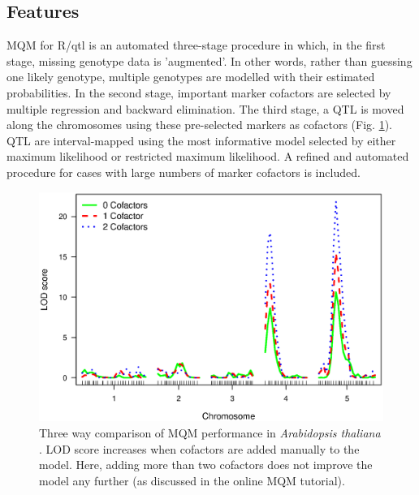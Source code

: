 \subsection{Features}
MQM for R/qtl is an automated three-stage procedure in which, in the first stage, missing 
genotype data is 'augmented'.  In other words, rather than guessing one likely genotype, 
multiple genotypes are modelled with their estimated probabilities. In the second stage, 
important marker cofactors are selected by multiple regression and backward elimination. 
The third stage, a QTL is moved along the chromosomes using these pre-selected markers as 
cofactors (Fig. \ref{fig:comparison}). QTL are interval-mapped using the most informative 
model selected by either maximum likelihood or restricted maximum likelihood. A refined 
and automated procedure for cases with large numbers of marker cofactors is included. 

\begin{figure}[h!]
  \centering
  \includegraphics[keepaspectratio,scale=0.30]{eps/image_3_3.eps}
  \caption[Comparison of QTL mapping methodologies.]{ Three way comparison of MQM performance in {\it Arabidopsis 
          thaliana} \citep{Fu:2007}. LOD score increases when cofactors are added manually to the model. Here, 
          adding more than two cofactors does not improve the model any further (as discussed in the online 
          MQM tutorial).}
  \label{fig:comparison}
\end{figure}

